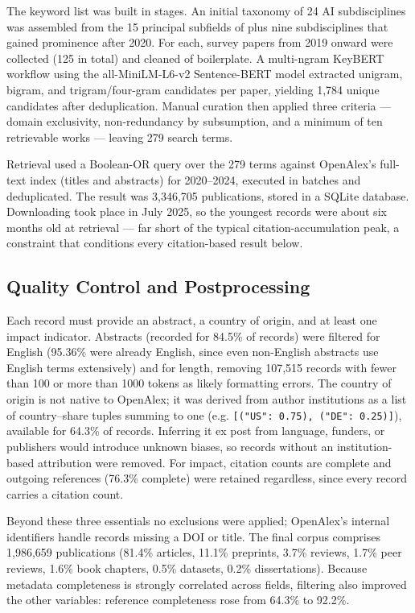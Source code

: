 \documentclass{article}
\let\cite\parencite
\begin{document}
	The keyword list was built in stages. An initial taxonomy of 24 AI subdisciplines was assembled from the 15 principal subfields of \citeauthor{gargiulo2022cartography} \cite{gargiulo2022cartography} plus nine subdisciplines that gained prominence after 2020. For each, survey papers from 2019 onward were collected (125 in total) and cleaned of boilerplate. A multi-ngram KeyBERT workflow using the all-MiniLM-L6-v2 Sentence-BERT model \cite{reimers2019sentencebert} extracted unigram, bigram, and trigram/four-gram candidates per paper, yielding 1,784 unique candidates after deduplication. Manual curation then applied three criteria --- domain exclusivity, non-redundancy by subsumption, and a minimum of ten retrievable works --- leaving 279 search terms.
	
	Retrieval used a Boolean-OR query over the 279 terms against OpenAlex's full-text index (titles and abstracts) for 2020--2024, executed in batches and deduplicated. The result was 3,346,705 publications, stored in a SQLite database. Downloading took place in July 2025, so the youngest records were about six months old at retrieval --- far short of the typical citation-accumulation peak, a constraint that conditions every citation-based result below.
	
	\subsection{Quality Control and Postprocessing}
	\label{quality_control_and_postprocessing}
	
	Each record must provide an abstract, a country of origin, and at least one impact indicator. Abstracts (recorded for 84.5\% of records) were filtered for English (95.36\% were already English, since even non-English abstracts use English terms extensively) and for length, removing 107,515 records with fewer than 100 or more than 1000 tokens as likely formatting errors. The country of origin is not native to OpenAlex; it was derived from author institutions as a list of country--share tuples summing to one (e.g. \texttt{[("US": 0.75), ("DE": 0.25)]}), available for 64.3\% of records. Inferring it ex post from language, funders, or publishers would introduce unknown biases, so records without an institution-based attribution were removed. For impact, citation counts are complete and outgoing references (76.3\% complete) were retained regardless, since every record carries a citation count.
	
	Beyond these three essentials no exclusions were applied; OpenAlex's internal identifiers handle records missing a DOI or title. The final corpus comprises 1,986,659 publications (81.4\% articles, 11.1\% preprints, 3.7\% reviews, 1.7\% peer reviews, 1.6\% book chapters, 0.5\% datasets, 0.2\% dissertations). Because metadata completeness is strongly correlated across fields, filtering also improved the other variables: reference completeness rose from 64.3\% to 92.2\%.
	
\end{document}
